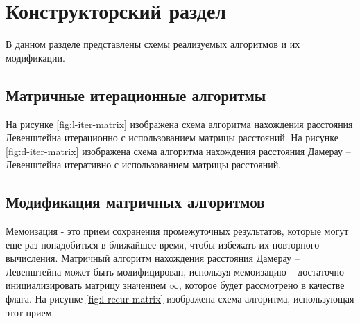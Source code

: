 \chapter{Конструкторский раздел}
В данном разделе представлены схемы реализуемых алгоритмов и их модификации.
\section{Матричные итерационные алгоритмы}
На рисунке \ref{fig:l-iter-matrix} изображена схема алгоритма нахождения расстояния Левенштейна итерационно  с использованием матрицы расстояний.
На рисунке \ref{fig:d-iter-matrix} изображена схема алгоритма нахождения расстояния Дамерау -- Левенштейна итеративно  с использованием матрицы расстояний.
\section{Модификация матричных алгоритмов}
Мемоизация - это прием сохранения промежуточных результатов, которые могут еще раз понадобиться в ближайшее время, чтобы избежать их повторного вычисления. 
Матричный алгоритм нахождения расстояния Дамерау -- Левенштейна может быть модифицирован, используя мемоизацию -- достаточно инициализировать матрицу значением $\infty$, которое будет рассмотрено в качестве флага.
На рисунке \ref{fig:l-recur-matrix} изображена схема алгоритма, использующая этот прием.
